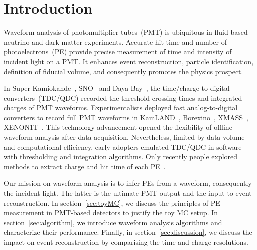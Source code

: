 \section{Introduction}
\label{sec:introduction}

Waveform analysis of photomultiplier tubes~(PMT) is ubiquitous in fluid-based neutrino and dark matter experiments. Accurate hit time and number of photoelectrons~(PE) provide precise measurement of time and intensity of incident light on a PMT. It enhances event reconstruction, particle identification, definition of fiducial volume, and consequently promotes the physics prospect.

In Super-Kamiokande~\cite{noauthor_super-kamiokande_2003}, SNO~\cite{dunger_event_2019} and Daya Bay~\cite{daya_bay_collaboration_measurement_2017}, the time/charge to digital converters~(TDC/QDC) recorded the threshold crossing times and integrated charges of PMT waveforms.  Experimentalists deployed fast analog-to-digital converters to record full PMT waveforms in KamLAND~\cite{kamland_collaboration_production_2010}, Borexino~\cite{alimonti_borexino_2009}, XMASS~\cite{abe_xmass_2013}, XENON1T~\cite{xenon_collaboration_xenon1t_2019}.  This technology advancement opened the flexibility of offline waveform analysis after data acquisition.  Nevertheless, limited by data volume and computational efficiency, early adopters emulated TDC/QDC in software with thresholding and integration algorithms.  Only recently people explored methods to extract charge and hit time of each PE~\cite{zhang_comparison_2019}.

Our mission on waveform analysis is to infer PEs from a waveform, consequently the incident light.  The latter is the ultimate PMT output and the input to event reconstruction.  In section~\ref{sec:toyMC}, we discuss the principles of PE measurement in PMT-based detectors to justify the toy MC setup.  In section~\ref{sec:algorithm}, we introduce waveform analysis algorithms and characterize their performance.  Finally, in section~\ref{sec:discussion}, we discuss the impact on event reconstruction by comparising the time and charge resolutions.
